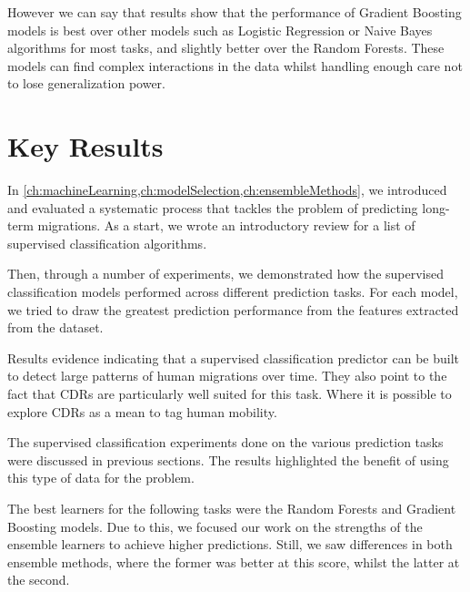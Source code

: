However we can say that results show that the performance of Gradient Boosting models is best over other models such as Logistic Regression or Naive Bayes algorithms for most tasks, and slightly better over the Random Forests. 
These models can find complex interactions in the data whilst handling enough care not to lose generalization power.




\section{Key Results}







In \cref{ch:machineLearning,ch:modelSelection,ch:ensembleMethods}, we introduced and evaluated a systematic process that tackles the problem of predicting long-term migrations.
As a start, we wrote an introductory review for a list of supervised classification algorithms.

Then, through a number of experiments, we demonstrated how the supervised classification models performed across different prediction tasks.
For each model, we tried to draw the greatest prediction performance from the features extracted from the dataset.

Results evidence indicating that a supervised classification predictor can be built to detect large patterns of human migrations over time.
They also point to the fact that CDRs are particularly well suited for this task.
Where it is possible to explore CDRs as a mean to tag human mobility.


The supervised classification experiments done on the various prediction tasks were discussed in previous sections.
The results highlighted the benefit of using this type of data for the problem.


The best learners for the following tasks were the Random Forests and Gradient Boosting models.
Due to this, we focused our work on the strengths of the ensemble learners to achieve higher predictions.
Still, we saw differences in both ensemble methods, where the former was better at this score, whilst the latter at the second.


